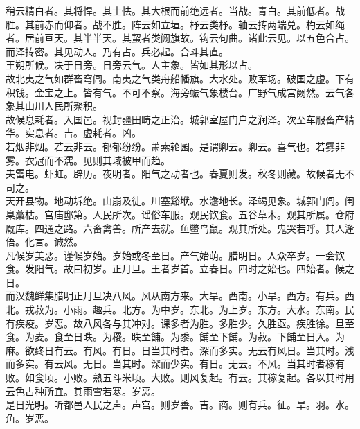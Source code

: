 \documentclass{zhvt-classic}
\begin{document}
\hspace*{2em}稍云精白者。其将悍。其士怯。其大根而前绝远者。当战。青白。其前低者。战胜。其前赤而仰者。战不胜。阵云如立垣。杼云类杼。轴云抟两端兑。杓云如绳者。居前亘天。其半半天。其蛪者类阙旗故。钩云句曲。诸此云见。以五色合占。而泽抟密。其见动人。乃有占。兵必起。合斗其直。\\
\hspace*{2em}王朔所候。决于日旁。日旁云气。人主象。皆如其形以占。\\
\hspace*{2em}故北夷之气如群畜穹闾。南夷之气类舟船幡旗。大水处。败军场。破国之虚。下有积钱。金宝之上。皆有气。不可不察。海旁蜄气象楼台。广野气成宫阙然。云气各象其山川人民所聚积。\\
\hspace*{2em}故候息耗者。入国邑。视封疆田畴之正治。城郭室屋门户之润泽。次至车服畜产精华。实息者。吉。虚耗者。凶。\\
\hspace*{2em}若烟非烟。若云非云。郁郁纷纷。萧索轮囷。是谓卿云。卿云。喜气也。若雾非雾。衣冠而不濡。见则其域被甲而趋。\\
\hspace*{2em}夫雷电。虾虹。辟历。夜明者。阳气之动者也。春夏则发。秋冬则藏。故候者无不司之。\\
\hspace*{2em}天开县物。地动坼绝。山崩及徙。川塞谿垘。水澹地长。泽竭见象。城郭门闾。闺臬藁枯。宫庙邸第。人民所次。谣俗车服。观民饮食。五谷草木。观其所属。仓府厩库。四通之路。六畜禽兽。所产去就。鱼鳖鸟鼠。观其所处。鬼哭若呼。其人逢俉。化言。诚然。\\
\hspace*{2em}凡候岁美恶。谨候岁始。岁始或冬至日。产气始萌。腊明日。人众卒岁。一会饮食。发阳气。故曰初岁。正月旦。王者岁首。立春日。四时之始也。四始者。候之日。\\
\hspace*{2em}而汉魏鲜集腊明正月旦决八风。风从南方来。大旱。西南。小旱。西方。有兵。西北。戎菽为。小雨。趣兵。北方。为中岁。东北。为上岁。东方。大水。东南。民有疾疫。岁恶。故八风各与其冲对。课多者为胜。多胜少。久胜亟。疾胜徐。旦至食。为麦。食至日昳。为稷。昳至餔。为黍。餔至下餔。为菽。下餔至日入。为麻。欲终日有云。有风。有日。日当其时者。深而多实。无云有风日。当其时。浅而多实。有云风。无日。当其时。深而少实。有日。无云。不风。当其时者稼有败。如食顷。小败。熟五斗米顷。大败。则风复起。有云。其稼复起。各以其时用云色占种所宜。其雨雪若寒。岁恶。\\
\hspace*{2em}是日光明。听都邑人民之声。声宫。则岁善。吉。商。则有兵。征。旱。羽。水。角。岁恶。\\
\end{document}
